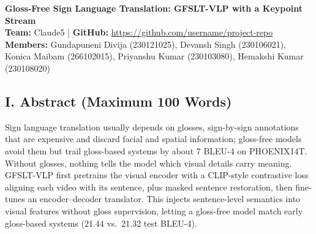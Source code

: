 \documentclass[8pt,a4paper]{article}
\begin{document}
\thispagestyle{empty}

\begin{center}

{\large\bfseries
Gloss-Free Sign Language Translation: GFSLT-VLP with a Keypoint Stream}\\[4pt]

\textbf{Team:} Claude5
\quad | \quad
\textbf{GitHub:}
\url{https://github.com/username/project-repo}\\[2pt]
\textbf{Members:}
Gundapuneni Divija (230121025), Devansh Singh (230106021), Konica Maibam (266102015),
Priyanshu Kumar (230103080), Hemakshi Kumar (230108020)

\end{center}

\vspace{-5pt}

\subsection*{I. Abstract (Maximum 100 Words)}
Sign language translation usually depends on glosses, sign-by-sign annotations that are expensive and discard facial and spatial information; gloss-free models avoid them but trail gloss-based systems by about 7 BLEU-4 on PHOENIX14T. Without glosses, nothing tells the model which visual details carry meaning. GFSLT-VLP first pretrains the visual encoder with a CLIP-style contrastive loss aligning each video with its sentence, plus masked sentence restoration, then fine-tunes an encoder--decoder translator. This injects sentence-level semantics into visual features without gloss supervision, letting a gloss-free model match early gloss-based systems (21.44 vs.\ 21.32 test BLEU-4).

\end{document}

